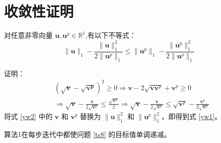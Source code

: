 \section{收敛性证明}
\begin{lemma}
   对任意非零向量 $\mathbf{u},\mathbf{u}^p\in\mathbb{R}^1$,有以下不等式：
   \begin{equation}
   \|\mathbf{u}\|_{1}-\frac{\|\mathbf{u}\|^{2}_{1}}{2\|\mathbf{u}^p\|_{1}}\le
   \|\mathbf{u}^p\|_{1}-\frac{\|\mathbf{u}^p\|^{2}_{1}}{2\|\mathbf{u}^p\|_{1}}
   \label{yw1}
   \end{equation}
\end{lemma}

证明：
\begin{equation}
\begin{aligned}
&(\sqrt{\mathbf{v}}-\sqrt{\mathbf{v^p}})^2\ge0
\Rightarrow\mathbf{v}-2\sqrt{\mathbf{vv}^p}+\mathbf{v}^p\ge0\\
&\Rightarrow\sqrt{\mathbf{v}}-\frac{\mathbf{v}}{2\sqrt{\mathbf{v}^p}}\le
\frac{\sqrt{\mathbf{v}^p}}{2}
\Rightarrow\sqrt{\mathbf{v}}-\frac{\mathbf{v}}{2\sqrt{\mathbf{v}^p}}\le
\sqrt{\mathbf{v}^p}-\frac{\mathbf{v}^p}{2\sqrt{\mathbf{v}^p}}
\end{aligned}
\label{yw2}
\end{equation}
将式 \eqref{yw2} 中的 $\mathbf{v}$ 和 $\mathbf{v}^p$ 替换为 $\|\mathbf{u}\|^{2}_{1}$ 和 $\|\mathbf{u}^p\|^{2}_{1}$，即得到式 \eqref{yw1}。

\begin{theorem}
   算法1在每步迭代中都使问题 \eqref{ts8} 的目标值单调递减。
\end{theorem}

